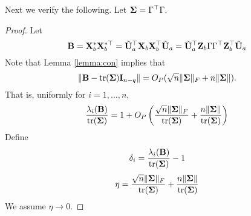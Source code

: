 \documentclass[11pt]{article}
\DeclareMathOperator{\mytr}{tr}
\theoremstyle{plain}
\theoremstyle{definition}
\theoremstyle{remark}
\begin{document}
Next we verify the following.
Let $\boldsymbol{\Sigma}=\Gamma^\top \Gamma$.
\begin{proof}
    Let
    \begin{equation*}
    \mathbf{B}=\mathbf{X}_b^* \mathbf{X}_b^{*\top} 
    =
    \tilde{\mathbf{U}}_a^\top \mathbf{X}_b \mathbf{X}_b^{\top} \tilde{\mathbf{U}}_a 
    =
    \tilde{\mathbf{U}}_a^\top \mathbf{Z}_b\Gamma \Gamma^\top \mathbf{Z}_b^{\top} \tilde{\mathbf{U}}_a 
    \end{equation*}
    Note that Lemma \ref{lemma:con} implies that
    \begin{equation*}
        \|\BB-\mytr(\bSigma)\BI_{n-q} \|
        = 
        O_P(\sqrt{n} \|\bSigma\|_F + n \|\bSigma\|).
    \end{equation*}
    That is, uniformly for $i=1,\ldots,n$,
    \begin{equation*}
        \frac{ \lambda_i (\BB) } {\mytr (\bSigma)} = 1 + O_P \left( \frac{\sqrt n \|\bSigma\|_F}{\mytr(\bSigma)} + \frac{n \|\bSigma\|}{\mytr(\bSigma)}\right)
    \end{equation*}
    Define
    \begin{equation*}
        \delta_i= \frac{ \lambda_i (\BB) } {\mytr (\bSigma)}-1
    \end{equation*}
    \begin{equation*}
        \eta= \frac{\sqrt n \|\bSigma\|_F}{\mytr(\bSigma)} + \frac{n \|\bSigma\|}{\mytr(\bSigma)}
    \end{equation*}
    We assume $\eta \to 0$.


\end{proof}
\end{document}
